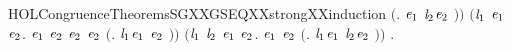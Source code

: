 \begin{SaveVerbatim}{HOLCongruenceTheoremsSGXXGSEQXXstrongXXinduction}
             \ensuremath{(}\HOLTokenLambda{}. \HOLConst{\ensuremath{\tau}}\HOLSymConst{\ensuremath{\ldotp}}\ensuremath{\HOLBoundVar{e}\sb{\mathrm{1}}}  \HOLSymConst{\ensuremath{+}}  \ensuremath{\HOLBoundVar{l}\sb{\mathrm{2}}}\HOLSymConst{\ensuremath{\ldotp}}\ensuremath{\HOLBoundVar{e}\sb{\mathrm{2}}} \ensuremath{)}\ensuremath{)} \HOLSymConst{\HOLTokenConj{}}
       \ensuremath{(}\HOLSymConst{\HOLTokenForall{}}\ensuremath{\HOLBoundVar{l}\sb{\mathrm{1}}} \ensuremath{\HOLBoundVar{e}\sb{\mathrm{1}}} \ensuremath{\HOLBoundVar{e}\sb{\mathrm{2}}}.
             \ensuremath{\HOLBoundVar{e}\sb{\mathrm{1}}} \HOLSymConst{\HOLTokenConj{}}  \ensuremath{\HOLBoundVar{e}\sb{\mathrm{2}}} \HOLSymConst{\HOLTokenConj{}}  \ensuremath{\HOLBoundVar{e}\sb{\mathrm{2}}} \HOLSymConst{\HOLTokenConj{}}  \ensuremath{\HOLBoundVar{e}\sb{\mathrm{2}}} \HOLSymConst{\HOLTokenImp{}}
             \ensuremath{(}\HOLTokenLambda{}.  \ensuremath{\HOLBoundVar{l}\sb{\mathrm{1}}}\HOLSymConst{\ensuremath{\ldotp}}\ensuremath{\HOLBoundVar{e}\sb{\mathrm{1}}}  \HOLSymConst{\ensuremath{+}} \HOLConst{\ensuremath{\tau}}\HOLSymConst{\ensuremath{\ldotp}}\ensuremath{\HOLBoundVar{e}\sb{\mathrm{2}}} \ensuremath{)}\ensuremath{)} \HOLSymConst{\HOLTokenConj{}}
       \ensuremath{(}\HOLSymConst{\HOLTokenForall{}}\ensuremath{\HOLBoundVar{l}\sb{\mathrm{1}}} \ensuremath{\HOLBoundVar{l}\sb{\mathrm{2}}} \ensuremath{\HOLBoundVar{e}\sb{\mathrm{1}}} \ensuremath{\HOLBoundVar{e}\sb{\mathrm{2}}}.
             \ensuremath{\HOLBoundVar{e}\sb{\mathrm{1}}} \HOLSymConst{\HOLTokenConj{}}  \ensuremath{\HOLBoundVar{e}\sb{\mathrm{2}}} \HOLSymConst{\HOLTokenImp{}}
             \ensuremath{(}\HOLTokenLambda{}.  \ensuremath{\HOLBoundVar{l}\sb{\mathrm{1}}}\HOLSymConst{\ensuremath{\ldotp}}\ensuremath{\HOLBoundVar{e}\sb{\mathrm{1}}}  \HOLSymConst{\ensuremath{+}}  \ensuremath{\HOLBoundVar{l}\sb{\mathrm{2}}}\HOLSymConst{\ensuremath{\ldotp}}\ensuremath{\HOLBoundVar{e}\sb{\mathrm{2}}} \ensuremath{)}\ensuremath{)} \HOLSymConst{\HOLTokenImp{}}
       \HOLSymConst{\HOLTokenForall{}}.   \HOLSymConst{\HOLTokenConj{}}   \HOLSymConst{\HOLTokenImp{}}  
\end{SaveVerbatim}
\newcommand{\HOLCongruenceTheoremsSGXXGSEQXXstrongXXinduction}{\UseVerbatim{HOLCongruenceTheoremsSGXXGSEQXXstrongXXinduction}}
